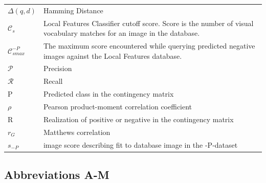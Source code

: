 \documentclass[english,12pt,a4paper,pdftex,elec,utf8, table]{aaltothesis}
\begin{document}
\begin{tabular}{ll}
$\Delta(q,d)$ & Hamming Distance\\
$\mathcal{C}_s$ & Local Features Classifier cutoff score. Score is the number of visual vocabulary matches for an image in the database.\\
$\mathcal{C}_{smax}^{-P}$ & The maximum score encountered while querying predicted negative images against the Local Features database.\\
  $\mathcal{P}$ & Precision\\
  $\mathcal{R}$ & Recall\\
  P & Predicted class in the contingency matrix\\
  $\rho$ & Pearson product-moment correlation coefficient\\
  R & Realization of positive or negative in the contingency matrix\\
  $r_G$ & Matthews correlation\\
  $s_{-P}$ & image score describing fit to database image in the -P-dataset\\
\end{tabular}

\subsection*{Abbreviations A-M}
\end{document}
